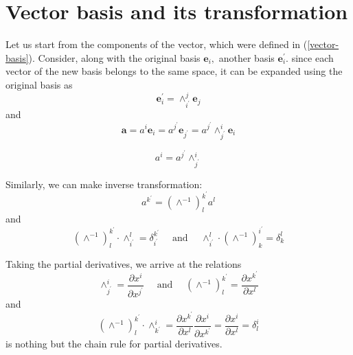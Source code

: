 \section{Vector basis and its transformation}
Let us start from the components of the vector, which were defined in (\ref{vector-basis}). Consider, along with the original basis $\mathbf{e}_{i},$ another basis $\mathbf{e}_{i}^{\prime} .$ since each vector of the new basis belongs to the same space, it can be expanded using the original basis as
\begin{equation}
\mathbf{e}_{i}^{\prime}=\wedge_{i^{\prime}}^{j} \mathbf{e}_{j}
\label{basis-transform}
\end{equation}
and
$$
\mathbf{a}=a^{i} \mathbf{e}_{i}=a^{j^{\prime}} \mathbf{e}_{j^{\prime}}=a^{j^{\prime}} \wedge_{j^{\prime}}^{i} \mathbf{e}_{i}
$$
\begin{qt}
\begin{equation}
    a^{i}=a^{j^{\prime}} \wedge_{j^{\prime}}^{i}
    \label{cotravariant-coord-transform}
\end{equation}
\end{qt}

Similarly, we can make inverse transformation:
$$
a^{k^{\prime}}=\left(\wedge^{-1}\right)_{l}^{k^{\prime}} a^{l}
$$
and
\[
\left(\wedge^{-1}\right)_{l}^{k^{\prime}} \cdot \wedge_{i^{\prime}}^{l}=\delta_{i^{\prime}}^{k^{\prime}} \quad \text { and } \quad \wedge_{i^{\prime}}^{l} \cdot\left(\wedge^{-1}\right)_{k}^{i^{\prime}}=\delta_{k}^{l}
\]
\begin{qt}
Taking the partial derivatives, we arrive at the relations
\[
\wedge_{j^{\prime}}^{i}=\frac{\partial x^{i}}{\partial x^{j^{\prime}}} \quad \text { and } \quad\left(\wedge^{-1}\right)_{l}^{k^{\prime}}=\frac{\partial x^{k^{\prime}}}{\partial x^{l}}
\]
and
$$
\left(\wedge^{-1}\right)_{l}^{k^{\prime}} \cdot \wedge_{k^{\prime}}^{i}=\frac{\partial x^{k^{\prime}}}{\partial x^{l}} \frac{\partial x^{i}}{\partial x^{k^{\prime}}}=\frac{\partial x^{i}}{\partial x^{l}}=\delta_{l}^{i}
$$
is nothing but the chain rule for partial derivatives.
\end{qt}

